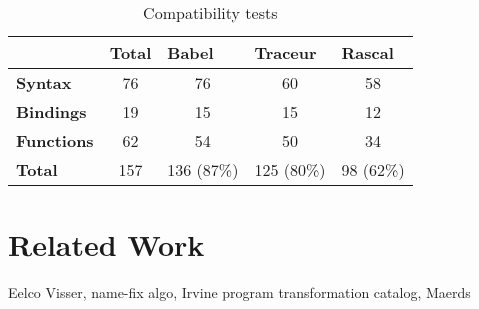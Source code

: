 \begin{table}[h]
\centering
\caption{Compatibility tests}
\label{my-label}
\begin{tabular}{@{}lcccc@{}}
\toprule
                & {\bf Total} & \multicolumn{1}{l}{{\bf Babel}} & \multicolumn{1}{l}{{\bf Traceur}} & \multicolumn{1}{l}{{\bf Rascal}} \\ \midrule
{\bf Syntax}    & 76          & 76                              & 60                                & 58                               \\
{\bf Bindings}  & 19          & 15                              & 15                                & 12                               \\
{\bf Functions} & 62          & 54                              & 50                                & 34                               \\
{\bf Total}     & 157         & 136 (87\%)                      & 125 (80\%)                        & 98 (62\%)                        \\ \bottomrule
\end{tabular}
\end{table}

\section{Related Work}
Eelco Visser,
name-fix algo,
Irvine program transformation catalog,
Maerds

